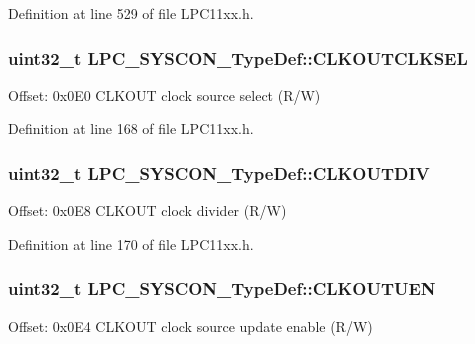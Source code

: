 Definition at line 529 of file L\+P\+C11xx.\+h.

\subsubsection[{\texorpdfstring{C\+L\+K\+O\+U\+T\+C\+L\+K\+S\+EL}{CLKOUTCLKSEL}}]{ uint32\+\_\+t L\+P\+C\+\_\+\+S\+Y\+S\+C\+O\+N\+\_\+\+Type\+Def\+::\+C\+L\+K\+O\+U\+T\+C\+L\+K\+S\+EL}\hypertarget{group___l_p_c11xx___definitions_gac29fe890ede735895af857345a6d6cb2}{}\label{group___l_p_c11xx___definitions_gac29fe890ede735895af857345a6d6cb2}
Offset\+: 0x0\+E0 C\+L\+K\+O\+UT clock source select (R/W) 

Definition at line 168 of file L\+P\+C11xx.\+h.

\subsubsection[{\texorpdfstring{C\+L\+K\+O\+U\+T\+D\+IV}{CLKOUTDIV}}]{ uint32\+\_\+t L\+P\+C\+\_\+\+S\+Y\+S\+C\+O\+N\+\_\+\+Type\+Def\+::\+C\+L\+K\+O\+U\+T\+D\+IV}\hypertarget{group___l_p_c11xx___definitions_ga88ef5401531552a52e072c288d2e0900}{}\label{group___l_p_c11xx___definitions_ga88ef5401531552a52e072c288d2e0900}
Offset\+: 0x0\+E8 C\+L\+K\+O\+UT clock divider (R/W) 

Definition at line 170 of file L\+P\+C11xx.\+h.

\subsubsection[{\texorpdfstring{C\+L\+K\+O\+U\+T\+U\+EN}{CLKOUTUEN}}]{ uint32\+\_\+t L\+P\+C\+\_\+\+S\+Y\+S\+C\+O\+N\+\_\+\+Type\+Def\+::\+C\+L\+K\+O\+U\+T\+U\+EN}\hypertarget{group___l_p_c11xx___definitions_ga6e2e61850e73ee4ba00145e337568cdf}{}\label{group___l_p_c11xx___definitions_ga6e2e61850e73ee4ba00145e337568cdf}
Offset\+: 0x0\+E4 C\+L\+K\+O\+UT clock source update enable (R/W) 

